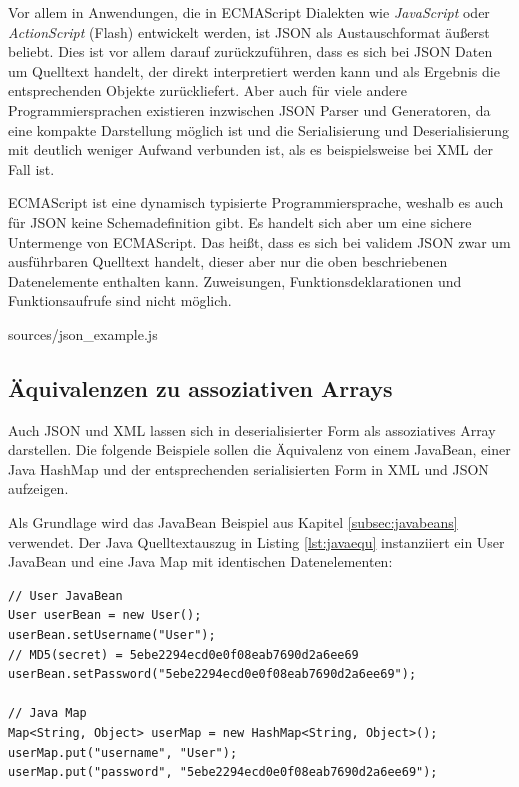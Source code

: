 Vor allem in Anwendungen, die in ECMAScript Dialekten wie \emph{JavaScript} oder
\emph{ActionScript} (Flash) entwickelt werden, ist \ac{JSON} als Austauschformat
äußerst beliebt. Dies ist vor allem darauf zurückzuführen, dass es sich bei
\ac{JSON} Daten um Quelltext handelt, der direkt interpretiert werden kann und
als Ergebnis die entsprechenden Objekte zurückliefert. Aber auch für viele andere
Programmiersprachen existieren inzwischen \ac{JSON} Parser und Generatoren, da
eine kompakte Darstellung möglich ist und die Serialisierung und Deserialisierung
mit deutlich weniger Aufwand verbunden ist, als es beispielsweise bei XML der
Fall ist.

ECMAScript ist eine dynamisch typisierte Programmiersprache, weshalb es auch für
\ac{JSON} keine Schemadefinition gibt. Es handelt sich aber um eine sichere
Untermenge von ECMAScript. Das heißt, dass es sich bei validem \ac{JSON} zwar um
ausführbaren Quelltext handelt, dieser aber nur die oben beschriebenen
Datenelemente enthalten kann. Zuweisungen, Funktionsdeklarationen und
Funktionsaufrufe sind nicht möglich.

\lstset{language=Java}
 {sources/json_example.js}

\subsection{Äquivalenzen zu assoziativen Arrays}\label{subsec:assocequ}
Auch \ac{JSON} und \ac{XML} lassen sich in deserialisierter Form als assoziatives
Array darstellen. Die folgende Beispiele sollen die Äquivalenz von einem
JavaBean, einer Java HashMap und der entsprechenden serialisierten Form in
\ac{XML} und \ac{JSON} aufzeigen.

Als Grundlage wird das JavaBean Beispiel aus Kapitel \ref{subsec:javabeans}
verwendet. Der Java Quelltextauszug in Listing \ref{lst:javaequ} instanziiert
ein User JavaBean und eine Java Map mit identischen Datenelementen:

\lstset{language=Java}
\begin{lstlisting}[caption=JavaBean und äquivalente Java Map, label=lst:javaequ]
// User JavaBean
User userBean = new User();
userBean.setUsername("User");
// MD5(secret) = 5ebe2294ecd0e0f08eab7690d2a6ee69
userBean.setPassword("5ebe2294ecd0e0f08eab7690d2a6ee69");
	
// Java Map
Map<String, Object> userMap = new HashMap<String, Object>();
userMap.put("username", "User");
userMap.put("password", "5ebe2294ecd0e0f08eab7690d2a6ee69");
\end{lstlisting}

